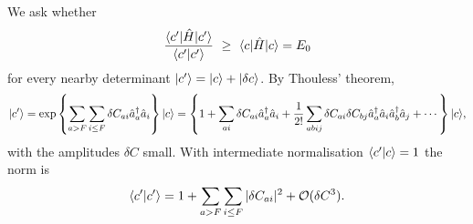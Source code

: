 We ask whether
\begin{equation}
  \frac{\langle c' | \hat{H} | c' \rangle}{\langle c' \vert c' \rangle}
  \ \ge\ \langle c | \hat{H} | c \rangle = E_0
  \label{eq:6-stabilitycondition}
\end{equation}
for every nearby determinant $\vert c' \rangle=\vert c \rangle+\vert \delta c \rangle$.  By
Thouless' theorem,
\begin{equation}
  \vert c' \rangle = \exp\left\{\sum_{a>F}\sum_{i\le F}\delta C_{ai}
    \hat{a}^{\dagger}_{a}\hat{a}_{i}\right\}\vert c \rangle
  = \left\{1+\sum_{ai}\delta C_{ai}\hat{a}^{\dagger}_{a}\hat{a}_{i}
    +\frac{1}{2!}\sum_{abij}\delta C_{ai}\delta C_{bj}
      \hat{a}^{\dagger}_{a}\hat{a}_{i}\hat{a}^{\dagger}_{b}\hat{a}_{j}
    +\cdots\right\}\vert c \rangle,
  \label{eq:6-cprimeexpansion}
\end{equation}
with the amplitudes $\delta C$ small.  With intermediate normalisation
$\langle c' \vert c \rangle=1$ the norm is
\begin{equation}
  \langle c' \vert c' \rangle = 1 + \sum_{a>F}\sum_{i\le F}\vert\delta C_{ai}\vert^2
    + \mathcal{O}(\delta C^3).
  \label{eq:6-cprimenorm}
\end{equation}


